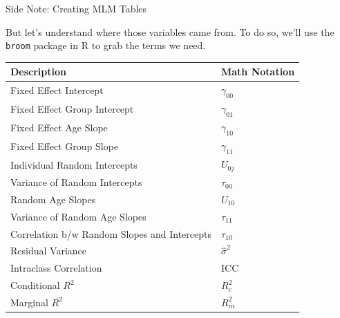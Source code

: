 \documentclass[ignorenonframetext,]{beamer}
\begin{document}
\begin{frame}[fragile]{Side Note: Creating MLM Tables}

But let's understand where those variables came from. To do so, we'll
use the \texttt{broom} package in R to grab the terms we need.

\begin{longtable}[]{@{}ll@{}}
\toprule
Description & Math Notation\tabularnewline
\midrule
\endhead
Fixed Effect Intercept & \(\gamma_{00}\)\tabularnewline
Fixed Effect Group Intercept & \(\gamma_{01}\)\tabularnewline
Fixed Effect Age Slope & \(\gamma_{10}\)\tabularnewline
Fixed Effect Group Slope & \(\gamma_{11}\)\tabularnewline
Individual Random Intercepts & \(U_{0j}\)\tabularnewline
Variance of Random Intercepts & \(\tau_{00}\)\tabularnewline
Random Age Slopes & \(U_{10}\)\tabularnewline
Variance of Random Age Slopes & \(\tau_{11}\)\tabularnewline
Correlation b/w Random Slopes and Intercepts &
\(\tau_{10}\)\tabularnewline
Residual Variance & \(\hat{\sigma}^2\)\tabularnewline
Intraclass Correlation & ICC\tabularnewline
Conditional \(R^2\) & \(R^2_c\)\tabularnewline
Marginal \(R^2\) & \(R^2_m\)\tabularnewline
\bottomrule
\end{longtable}

\end{frame}
\end{document}
